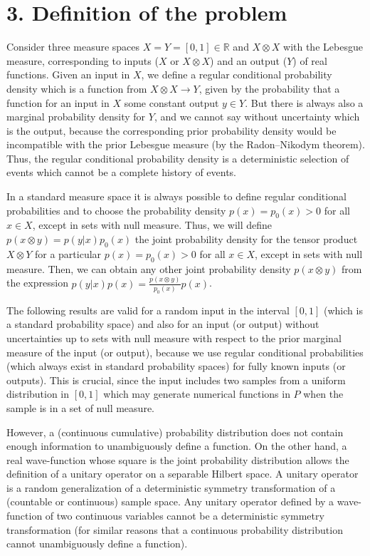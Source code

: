 \documentclass[11pt,a4paper]{report}
\begin{document}
\hypertarget{definition-of-the-problem}{%
\section{3. Definition of the problem}\label{definition-of-the-problem}}

Consider three measure spaces \(X=Y=[0,1]\in \mathbb{R}\) and
\(X\otimes X\) with the Lebesgue measure, corresponding to inputs (\(X\)
or \(X\otimes X\)) and an output (\(Y\)) of real functions. Given an
input in \(X\), we define a regular conditional probability density
which is a function from \(X\otimes X\to Y\), given by the probability
that a function for an input in \(X\) some constant output \(y\in Y\).
But there is always also a marginal probability density for \(Y\), and
we cannot say without uncertainty which is the output, because the
corresponding prior probability density would be incompatible with the
prior Lebesgue measure (by the Radon--Nikodym theorem). Thus, the
regular conditional probability density is a deterministic selection of
events which cannot be a complete history of events.

In a standard measure space it is always possible to define regular
conditional
probabilities\cite{durrett2019probability} and to choose the probability density \(p(x)=p_0(x)>0\) for all
\(x\in X\), except in sets with null measure. Thus, we will define
\(p(x\otimes y)=p(y|x)p_0(x)\) the joint probability density for the
tensor product \(X\otimes Y\) for a particular \(p(x)=p_0(x)>0\) for all
\(x\in X\), except in sets with null measure. Then, we can obtain any
other joint probability density \(p(x\otimes y)\) from the expression
\(p(y|x)p(x)=\frac{p(x\otimes y)}{p_0(x)}p(x)\).

The following results are valid for a random input in the interval
\([0,1]\) (which is a standard probability space) and also for an input
(or output) without uncertainties up to sets with null measure with
respect to the prior marginal measure of the input (or output), because
we use regular conditional probabilities (which always exist in standard
probability
spaces\cite{durrett2019probability})
for fully known inputs (or outputs). This is crucial, since the input
includes two samples from a uniform distribution in \([0,1]\) which may
generate numerical functions in \(P\) when the sample is in a set of
null measure.

However, a (continuous cumulative) probability distribution does not
contain enough information to unambiguously define a function. On the
other hand, a real wave-function whose square is the joint probability
distribution allows the definition of a unitary operator on a separable
Hilbert space. A unitary operator is a random generalization of a
deterministic symmetry transformation of a (countable or continuous)
sample space. Any unitary operator defined by a wave-function of two
continuous variables cannot be a deterministic symmetry transformation
(for similar reasons that a continuous probability distribution cannot
unambiguously define a function).
\end{document}
